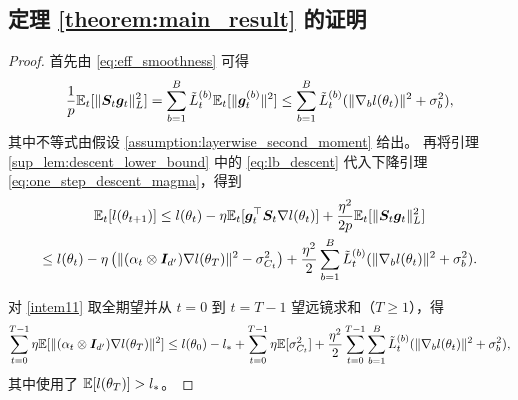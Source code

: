\documentclass[11pt, a4paper, twocolumn, copyright, goog]{google}
\theoremstyle{plain}
\theoremstyle{definition}
\theoremstyle{remark}
\begin{document}
\subsection{定理 \ref{theorem:main_result} 的证明}
\begin{proof}
    首先由 \eqref{eq:eff_smoothness} 可得  
    \begin{equation}
        \frac{1}{p} \mathbb{E}_t [\| {\bm{S}}_t {\bm{g}}_t \|^2_L] = \sum_{b=1}^{B} \tilde{L}_{t}^{(b)} \mathbb{E}_t[\| {\bm{g}}_t^{(b)} \|^2] \le \sum_{b=1}^{B} \tilde{L}_{t}^{(b)} (\|\nabla_b l(\theta_t) \|^2  + \sigma_b^2), 
    \end{equation}
    其中不等式由假设 \ref{assumption:layerwise_second_moment} 给出。
    再将引理 \ref{sup_lem:descent_lower_bound} 中的 \eqref{eq:lb_descent} 代入下降引理 \eqref{eq:one_step_descent_magma}，得到
    \begin{multline} \label{intem11}
        \mathbb{E}_t[l(\theta_{t+1})] 
            \leq l(\theta_t) - \eta \mathbb{E}_t [{\bm{g}}_t^\top {\bm{S}}_t  \nabla l(\theta_t)] + \frac{\eta^2}{2p} \mathbb{E}_t [\| {\bm{S}}_t {\bm{g}}_t \|_L^2 ] \\
                \leq l(\theta_t) - \eta \left( \| (\alpha_t \otimes {\bm{I}}_{d'}) \nabla l (\theta_T) \|^2 - \sigma^2_{C_t} \right) + \frac{\eta^2}{2} \sum_{b=1}^{B} \tilde{L}_{t}^{(b)} (\|\nabla_b l(\theta_t) \|^2  + \sigma_b^2).
    \end{multline}
    
    对 \eqref{intem11} 取全期望并从 $t=0$ 到 $t = T-1$ 望远镜求和（$T \ge 1$），得
    \begin{equation}
        \sum_{t=0}^{T-1} \eta \mathbb{E} [ \| (\alpha_t \otimes {\bm{I}}_{d'}) \nabla l (\theta_T) \|^2 ] 
        \le l(\theta_0) - l_* 
            + \sum_{t=0}^{T-1} \eta \mathbb{E}[\sigma^2_{C_t}] 
            + \frac{\eta^2}{2} \sum_{t=0}^{T-1} \sum_{b=1}^{B} \tilde{L}_{t}^{(b)} (\|\nabla_b l(\theta_t) \|^2  + \sigma_b^2),
    \end{equation}
    其中使用了 $\mathbb{E} [l(\theta_T)] > l_*$。
    

\end{proof}
\end{document}
